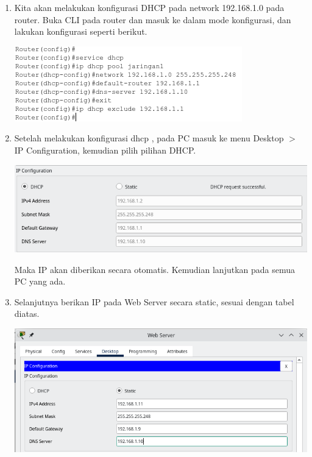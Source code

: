 \documentclass{article}
\begin{document}
\begin{flushleft}
\begin{enumerate}
            \item Kita akan melakukan konfigurasi DHCP pada network 192.168.1.0 pada router. Buka CLI pada router dan masuk ke dalam mode konfigurasi, dan lakukan konfigurasi seperti berikut.

            \begin{center}
                \includegraphics[]{3-3.png}
            \end{center}

            \item Setelah melakukan konfigurasi dhcp , pada PC masuk ke menu Desktop $>$ IP Configuration, kemudian pilih pilihan DHCP.
            
            \begin{center}
                \includegraphics[scale=0.6]{3-4.png}
            \end{center}
            Maka IP akan diberikan secara otomatis. 
            Kemudian lanjutkan pada semua PC yang ada.

            \item Selanjutnya berikan IP pada Web Server secara static, sesuai dengan tabel diatas.

            \begin{center}
                \includegraphics[scale=0.6]{3-5.png}
            \end{center}


\end{enumerate}
\end{flushleft}
\end{document}
